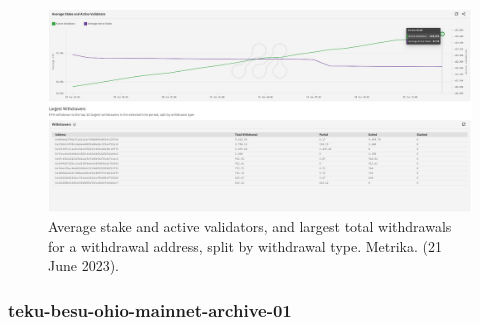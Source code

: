 \documentclass[UTF8]{article}
\begin{document}
\begin{figure}[htbp]
\begin{center}
\includegraphics[width=0.9\linewidth]{images/metrika6}
\caption{Average stake and active validators, and largest total withdrawals for a withdrawal address, split by withdrawal type.  Metrika. (21 June 2023). }
\label{fig:metrika6}
\end{center}
\end{figure}

\clearpage
\subsubsection*{teku-besu-ohio-mainnet-archive-01}
\end{document}
